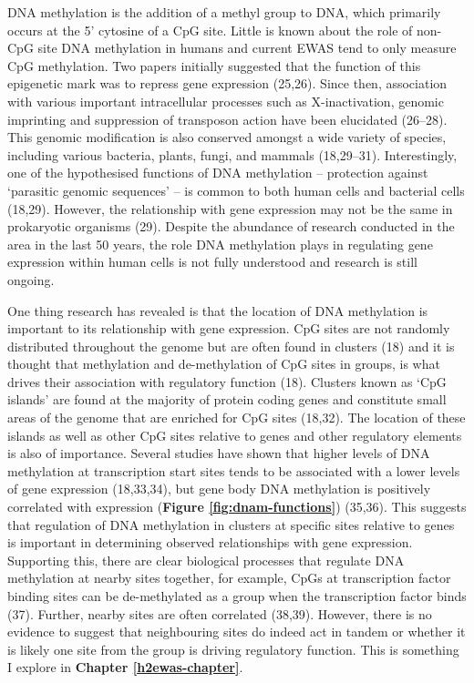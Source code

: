 \documentclass[11pt,oneside]{bristolthesis}
\begin{document}
DNA methylation is the addition of a methyl group to DNA, which primarily occurs at the 5' cytosine of a CpG site. Little is known about the role of non-CpG site DNA methylation in humans and current EWAS tend to only measure CpG methylation. Two papers initially suggested that the function of this epigenetic mark was to repress gene expression (25,26). Since then, association with various important intracellular processes such as X-inactivation, genomic imprinting and suppression of transposon action have been elucidated (26--28). This genomic modification is also conserved amongst a wide variety of species, including various bacteria, plants, fungi, and mammals (18,29--31). Interestingly, one of the hypothesised functions of DNA methylation -- protection against `parasitic genomic sequences' -- is common to both human cells and bacterial cells (18,29). However, the relationship with gene expression may not be the same in prokaryotic organisms (29). Despite the abundance of research conducted in the area in the last 50 years, the role DNA methylation plays in regulating gene expression within human cells is not fully understood and research is still ongoing.

One thing research has revealed is that the location of DNA methylation is important to its relationship with gene expression. CpG sites are not randomly distributed throughout the genome but are often found in clusters (18) and it is thought that methylation and de-methylation of CpG sites in groups, is what drives their association with regulatory function (18). Clusters known as `CpG islands' are found at the majority of protein coding genes and constitute small areas of the genome that are enriched for CpG sites (18,32). The location of these islands as well as other CpG sites relative to genes and other regulatory elements is also of importance. Several studies have shown that higher levels of DNA methylation at transcription start sites tends to be associated with a lower levels of gene expression (18,33,34), but gene body DNA methylation is positively correlated with expression (\textbf{Figure \ref{fig:dnam-functions}}) (35,36). This suggests that regulation of DNA methylation in clusters at specific sites relative to genes is important in determining observed relationships with gene expression. Supporting this, there are clear biological processes that regulate DNA methylation at nearby sites together, for example, CpGs at transcription factor binding sites can be de-methylated as a group when the transcription factor binds (37). Further, nearby sites are often correlated (38,39). However, there is no evidence to suggest that neighbouring sites do indeed act in tandem or whether it is likely one site from the group is driving regulatory function. This is something I explore in \textbf{Chapter \ref{h2ewas-chapter}}.
\end{document}
